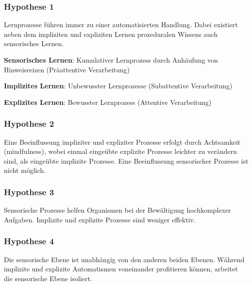 \documentclass[doc,a4paper,12pt]{apa6}
\begin{document}
\subsubsection{Hypothese 1}

Lernprozesse führen immer zu einer automatisierten Handlung. Dabei existiert neben dem impliziten und expliziten Lernen prozeduralen Wissens auch sensorisches Lernen.

\begin{compactitem}
  \item \textbf{Sensorisches Lernen}: Kumulativer Lernprozess durch Anhäufung von Hinweisreizen (Präattentive Verarbeitung)
  \item \textbf{Implizites Lernen}: Unbewusster Lernprozesse (Subattentive Verarbeitung)
  \item \textbf{Explizites Lernen}: Bewusster Lernprozess (Attentive Verarbeitung)
\end{compactitem}

\subsubsection{Hypothese 2}

Eine Beeinflussung impliziter und expliziter Prozesse erfolgt durch Achtsamkeit (mindfulness), wobei einmal eingeübte explizite Prozesse leichter zu verändern sind, als eingeübte implizite Prozesse. Eine Beeinflussung sensorischer Prozesse ist nicht möglich.

\subsubsection{Hypothese 3}

Sensorische Prozesse helfen Organismen bei der Bewältigung hochkomplexer Aufgaben. Implizite und explizite Prozesse sind weniger effektiv.

\subsubsection{Hypothese 4}

Die sensorische Ebene ist unabhängig von den anderen beiden Ebenen. Während implizite und explizite Automatismen voneinander profitieren können, arbeitet die sensorische Ebene isoliert.

\subsubsection{}
\end{document}
